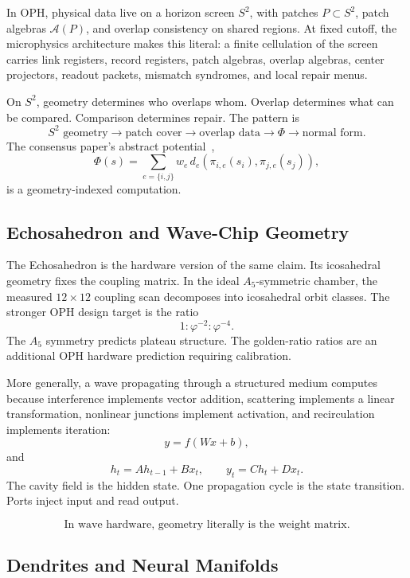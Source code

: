 \documentclass[11pt]{article}
\theoremstyle{remark}
\theoremstyle{plain}
\begin{document}
In OPH, physical data live on a horizon screen \(S^2\), with patches \(P\subset S^2\), patch algebras \(\mathcal A(P)\), and overlap consistency on shared regions. At fixed cutoff, the microphysics architecture makes this literal: a finite cellulation of the screen carries link registers, record registers, patch algebras, overlap algebras, center projectors, readout packets, mismatch syndromes, and local repair menus.

On \(S^2\), geometry determines who overlaps whom. Overlap determines what can be compared. Comparison determines repair. The pattern is
\[
\boxed{
S^2\text{ geometry}
\to
\text{patch cover}
\to
\text{overlap data}
\to
\Phi
\to
\text{normal form}.
}
\]
The consensus paper's abstract potential~\cite{RealityAsConsensusProtocol},
\[
\Phi(s)=
\sum_{e=\{i,j\}}
w_e\,d_e(\pi_{i,e}(s_i),\pi_{j,e}(s_j)),
\]
is a geometry-indexed computation.

\subsection{Echosahedron and Wave-Chip Geometry}

The Echosahedron is the hardware version of the same claim. Its icosahedral geometry fixes the coupling matrix. In the ideal \(A_5\)-symmetric chamber, the measured \(12\times12\) coupling scan decomposes into icosahedral orbit classes. The stronger OPH design target is the ratio
\[
1:\varphi^{-2}:\varphi^{-4}.
\]
The \(A_5\) symmetry predicts plateau structure. The golden-ratio ratios are an additional OPH hardware prediction requiring calibration.

More generally, a wave propagating through a structured medium computes because interference implements vector addition, scattering implements a linear transformation, nonlinear junctions implement activation, and recirculation implements iteration:
\[
y=f(Wx+b),
\]
and
\[
h_t=A h_{t-1}+B x_t,\qquad
y_t=C h_t+D x_t.
\]
The cavity field is the hidden state. One propagation cycle is the state transition. Ports inject input and read output.

\[
\boxed{
\text{In wave hardware, geometry literally is the weight matrix.}
}
\]

\subsection{Dendrites and Neural Manifolds}
\end{document}
